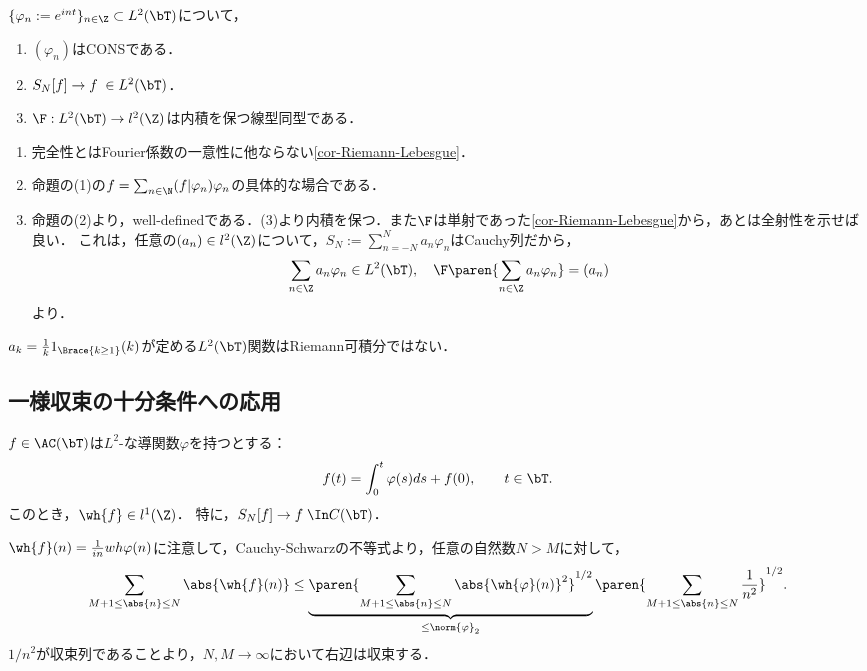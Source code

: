 \documentclass[uplatex,dvipdfmx]{jsreport}
\begin{document}
\begin{corollary}
    $\{\varphi_n:=e^{int}\}_{n\in\Z}\subset L^2(\bT)$について，
    \begin{enumerate}
        \item $(\varphi_n)$はCONSである．
        \item $S_N[f]\to f\;\in L^2(\bT)$．
        \item $\F:L^2(\bT)\to l^2(\Z)$は内積を保つ線型同型である．
    \end{enumerate}
\end{corollary}
\begin{Proof}\mbox{}
    \begin{enumerate}
        \item 完全性とはFourier係数の一意性に他ならない\ref{cor-Riemann-Lebesgue}．
        \item 命題の(1)の$f=\sum_{n\in\N}(f|\varphi_n)\varphi_n$の具体的な場合である．
        \item 命題の(2)より，well-definedである．(3)より内積を保つ．また$\F$は単射であった\ref{cor-Riemann-Lebesgue}から，あとは全射性を示せば良い．
        これは，任意の$(a_n)\in l^2(\Z)$について，$S_N:=\sum_{n=-N}^Na_n\varphi_n$はCauchy列だから，
        \[\sum_{n\in\Z}a_n\varphi_n\in L^2(\bT),\quad\F\paren{\sum_{n\in\Z}a_n\varphi_n}=(a_n)\]
        より．
    \end{enumerate}
\end{Proof}

\begin{remarks}
    $a_k=\frac{1}{k}1_{\Brace{k\ge1}}(k)$が定める$L^2(\bT)$関数はRiemann可積分ではない．
\end{remarks}

\subsection{一様収束の十分条件への応用}

\begin{proposition}
    $f\in\AC(\bT)$は$L^2$-な導関数$\varphi$を持つとする：
    \[f(t)=\int^t_0\varphi(s)ds+f(0),\qquad t\in\bT.\]
    このとき，$\wh{f}\in l^1(\Z)$．
    特に，$S_N[f]\to f\;\In C(\bT)$．
\end{proposition}
\begin{Proof}
    $\wh{f}(n)=\frac{1}{in}wh{\varphi}(n)$に注意して，Cauchy-Schwarzの不等式より，任意の自然数$N>M$に対して，
    \[\sum_{M+1\le\abs{n}\le N}\abs{\wh{f}(n)}\le\underbrace{\paren{\sum_{M+1\le\abs{n}\le N}\abs{\wh{\varphi}(n)}^2}^{1/2}}_{\le\norm{\varphi}_2}\paren{\sum_{M+1\le\abs{n}\le N}\frac{1}{n^2}}^{1/2}.\]
    $1/n^2$が収束列であることより，$N,M\to\infty$において右辺は収束する．
\end{Proof}
\end{document}
